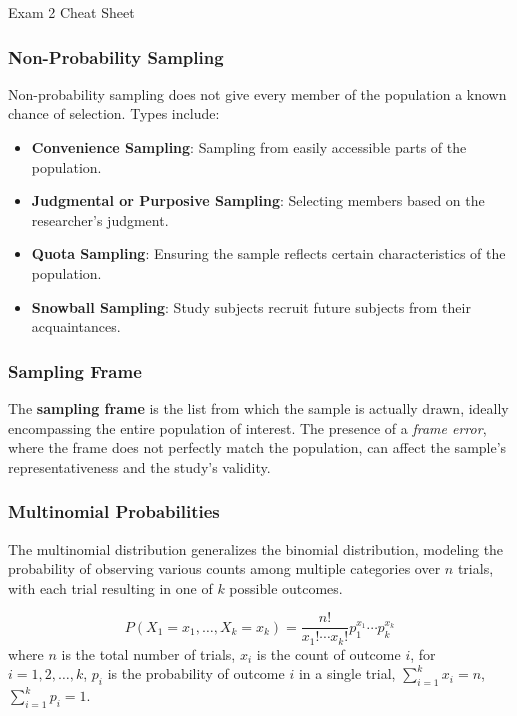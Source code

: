 \begin{cheatsheet}{Exam 2 Cheat Sheet}
{        \subsubsection*{Non-Probability Sampling}
        
        Non-probability sampling does not give every member of the population a known chance of selection. Types include:
        
        \begin{itemize}
            \item \textbf{Convenience Sampling}: Sampling from easily accessible parts of the population.
            \item \textbf{Judgmental or Purposive Sampling}: Selecting members based on the researcher's judgment.
            \item \textbf{Quota Sampling}: Ensuring the sample reflects certain characteristics of the population.
            \item \textbf{Snowball Sampling}: Study subjects recruit future subjects from their acquaintances.
        \end{itemize}
    
        \subsubsection*{Sampling Frame}
        
        The \textbf{sampling frame} is the list from which the sample is actually drawn, ideally encompassing the entire population of interest. The presence of a \textit{frame error}, where the frame 
        does not perfectly match the population, can affect the sample's representativeness and the study's validity.
    
        \subsubsection*{Multinomial Probabilities}
    
        The multinomial distribution generalizes the binomial distribution, modeling the probability of observing various counts among multiple categories over $n$ trials, with each trial resulting in one 
        of $k$ possible outcomes.
    
        \begin{equation*}
            P(X_1 = x_1, \ldots, X_k = x_k) = \frac{n!}{x_1! \cdots x_k!} p_1^{x_1} \cdots p_k^{x_k}
        \end{equation*}
        where $n$ is the total number of trials, $x_i$ is the count of outcome $i$, for $i = 1, 2, \ldots, k$, $p_i$ is the probability of outcome $i$ in a single trial, $\sum_{i=1}^{k} x_i = n$, 
        $\sum_{i=1}^{k} p_i = 1$.
    
}
\end{cheatsheet}
